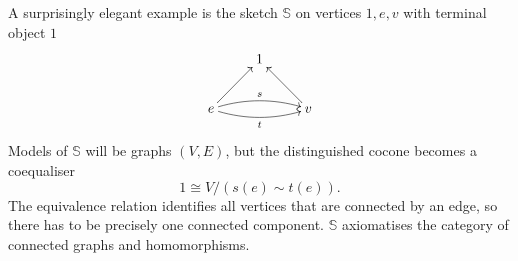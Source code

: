 \begin{Example}
A surprisingly elegant example is the sketch $\mathbb S$ on vertices $1,e,v$ with terminal object $1$ \[
\xymatrix{
& 1 \\
e \ar@/^/[rr]^{s} \ar@/_/[rr]_{t} \ar[ru] & & v \ar[lu] \\
}\]
Models of $\mathbb S$ will be graphs $(V,E)$, but the distinguished cocone becomes a coequaliser 
\[ 1 \cong V/(s(e)\sim t(e)). \]
The equivalence relation identifies all vertices that are connected by an edge, so there has to be precisely one connected component. $\mathbb S$ axiomatises the category of connected graphs and homomorphisms.
\end{Example}

